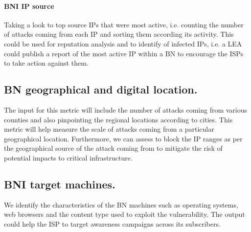     \paragraph{BNI IP source}
    Taking a look to top source IPs that were most active, i.e. counting the number of attacks coming from each IP and sorting them according its activity. This could be used for reputation analysis and to identify of infected IPs, i.e. a LEA could publish a report of the most active IP within a BN to encourage the ISPs to take action against them.


\subsection{BN geographical and digital location.} The input for this metric will include the number of attacks coming from various counties and also pinpointing the regional locations according to cities. This metric will help measure the scale of attacks coming from a particular geographical location. Furthermore, we can assess to block the IP ranges as per the geographical source of the attack coming from to mitigate the risk of potential impacts to critical infrastructure.


\subsection{BNI target machines.}
    We identify the characteristics of the BN machines such as operating systems, web browsers and the content type used to exploit the vulnerability. The output could help the ISP to target awareness campaigns across its subscribers.
\indent

